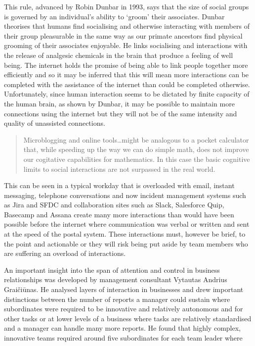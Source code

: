 This rule, advanced by Robin Dunbar in 1993, says that the size of social groups is governed by an individual's ability to `groom' their associates. Dunbar theorises that humans find socialising and otherwise interacting with members of their group pleasurable in the same way as our primate ancestors find physical grooming of their associates enjoyable. He links socialising and interactions with the release of analgesic chemicals in the brain that produce a feeling of well being\cite{RefWorks:438}.
The internet holds the promise of being able to link people together more efficiently and so it may be inferred that this will mean more interactions can be completed with the assistance of the internet than could be completed otherwise. Unfortunately, since human interaction seems to be dictated by finite capacity of the human brain, as shown by Dunbar, it may be possible to maintain more connections using the internet but they will not be of the same intensity and quality of unassisted connections.

\begin{quotation}
Microblogging and online tools\ldots might be analogous to a pocket calculator that, while speeding up the way we can do simple math, does not improve our cogitative capabilities for mathematics. In this case the basic cognitive limits to social interactions are not surpassed in the real world.
\end{quotation}

This can be seen in a typical workday that is overloaded with email, instant messaging, telephone conversations and now incident management systems such as Jira and SFDC and collaboration sites such as Slack, Salesforce Quip, Basecamp and Assana create many more interactions than would have been possible before the internet where communication was verbal or written and sent at the speed of the postal system. These interactions must, however be brief, to the point and actionable or they will risk being put aside by team members who are suffering an overload of interactions.

An important insight into the span of attention and control in business relationships was developed by management consultant Vytautas Andrius Grai\v ci\=unas. He analysed layers of interaction in businesses and drew important distinctions between the number of reports a manager could sustain where subordinates were required to be innovative and relatively autonomous and for other tasks or at lower levels of a business where tasks are relatively standardised and a manager can handle many more reports. He found that highly complex, innovative teams required around five subordinates for each team leader where 

